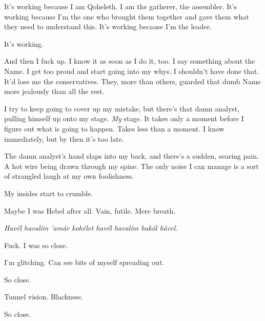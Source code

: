 It's working because I am Qoheleth. I am the gatherer, the assembler. It's working because I'm the one who brought them together and gave them what they need to understand this. It's working because I'm the leader.

It's working.

And then I fuck up. I know it as soon as I do it, too. I say something about the Name. I get too proud and start going into my whys. I shouldn't have done that. It'd lose me the conservatives. They, more than others, guarded that dumb Name more jealously than all the rest.

I try to keep going to cover up my mistake, but there's that damn analyst, pulling himself up onto my stage. \emph{My} stage. It takes only a moment before I figure out what is going to happen. Takes less than a moment. I know immediately, but by then it's too late.

The damn analyst's hand slaps into my back, and there's a sudden, searing pain. A hot wire being drawn through my spine. The only noise I can manage is a sort of strangled laugh at my own foolishness.

My insides start to crumble.

Maybe I was Hebel after all. Vain, futile. Mere breath.

\emph{Havél havalím 'amár kohélet havél havalím hakól hável.}

Fuck. I was so close.

I'm glitching. Can see bits of myself spreading out.

So close.

Tunnel vision. Blackness.

So close.

